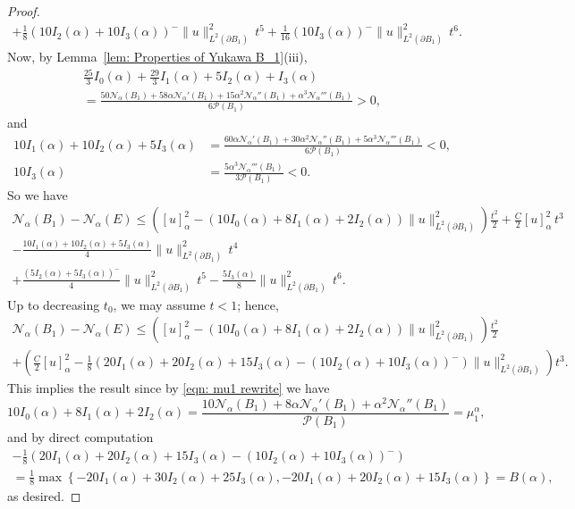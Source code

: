 \documentclass[a4paper,11pt,reqno]{amsart}
\numberwithin{equation}{section}
\theoremstyle{remark}
\theoremstyle{definition}
\newcommand{\nl}{\mathcal{N}_{\alpha}}
\renewcommand{\leq}{\leqslant}
\newcommand{\Pe}{\mathcal{P}}
\begin{document}
\begin{proof}
\begin{multline*}
		+ \frac{1}{8}\left(10I_2(\alpha)+10I_3(\alpha)\right)^-\|u\|_{L^2(\partial B_1)}^2\,t^5+ \frac{1}{16}\left(10I_3(\alpha)\right)^-\|u\|_{L^2(\partial B_1)}^2\,t^6.
	\end{multline*}
Now, by Lemma~\ref{lem: Properties of Yukawa B_1}(iii),
	\begin{multline*}
		\frac{25}{3}I_0(\alpha)+\frac{29}{3}I_1(\alpha)+5I_2(\alpha)+I_3(\alpha) \\
		= \frac{50\nl(B_1)+58\alpha \nl'(B_1)+15\alpha^2\nl''(B_1)+\alpha^3\nl'''(B_1)}{6\Pe(B_1)}>0,
	\end{multline*}
and
	\begin{align*}
		10I_1(\alpha)+10I_2(\alpha)+5I_3(\alpha)&=\frac{60\alpha \nl'(B_1)+30\alpha^2\nl''(B_1)+5\alpha^3\nl'''(B_1)}{6\Pe(B_1)} <0,\\
		10I_3(\alpha)&=\frac{5\alpha^3\nl'''(B_1)}{3\Pe(B_1)}<0.
	\end{align*}
So we have
	\begin{multline*}
		\nl(B_1)-\nl(E)\leq \left([u]_{\alpha}^2-\left(10I_0(\alpha)+8I_1(\alpha)+2I_2(\alpha)\right)\|u\|_{L^2(\partial B_1)}^2\right) \frac{t^2}{2} +\frac{C}{2}[u]_{\alpha}^2\,t^3 \\
		- \frac{10I_1(\alpha)+10I_2(\alpha)+5I_3(\alpha)}{4}\|u\|_{L^2(\partial B_1)}^2\,t^4 \\
		+ \frac{\left(5I_2(\alpha)+5I_3(\alpha)\right)^-}{4}\|u\|_{L^2(\partial B_1)}^2\,t^5- \frac{5I_3(\alpha)}{8}\|u\|_{L^2(\partial B_1)}^2\,t^6.
	\end{multline*}
Up to decreasing $t_0$, we may assume $t<1$; hence,
 	\begin{multline*}
		\nl(B_1)-\nl(E)\leq \left([u]_{\alpha}^2-\left(10I_0(\alpha)+8I_1(\alpha)+2I_2(\alpha)\right)\|u\|_{L^2(\partial B_1)}^2\right) \frac{t^2}{2} \\
		+\left(\frac{C}{2}[u]_{\alpha}^2-\frac{1}{8}\left(20I_1(\alpha)+20I_2(\alpha)+15I_3(\alpha)-\left(10I_2(\alpha)+10I_3(\alpha)\right)^-\right)\|u\|_{L^2(\partial B_1)}^2\right)t^3.
	\end{multline*}
This implies the result since by \eqref{eqn: mu1 rewrite} we have
	\[
		10I_0(\alpha)+8I_1(\alpha)+2I_2(\alpha) = \frac{10\nl(B_1)+8\alpha\nl'(B_1)+\alpha^2\nl''(B_1)}{\Pe(B_1)} = \mu_1^{\alpha},
	\]
and by direct computation
	\begin{multline*}
		-\frac{1}{8}\left(20I_1(\alpha)+20I_2(\alpha)+15I_3(\alpha)-\left(10I_2(\alpha)+10I_3(\alpha)\right)^-\right) \\
	=\frac{1}{8}\max\left\lbrace -20I_1(\alpha)+30I_2(\alpha)+25I_3(\alpha),-20I_1(\alpha)+20I_2(\alpha)+15I_3(\alpha)\right\rbrace =B(\alpha),
	\end{multline*}
as desired.
\end{proof}
\end{document}
